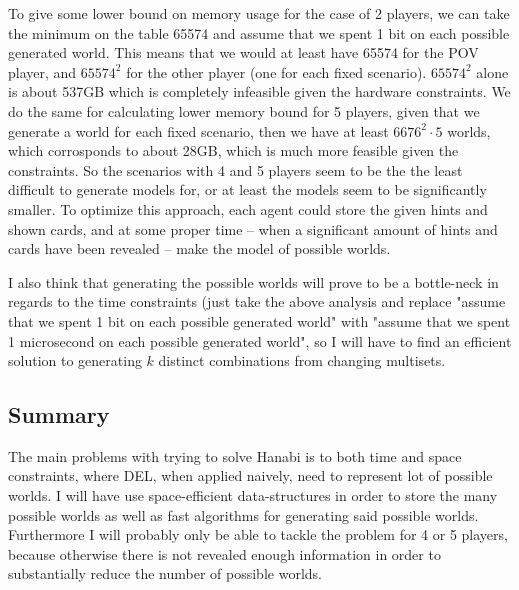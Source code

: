 To give some lower bound on memory usage for the case of 2 players, we can take the minimum on the table 65574 and assume that we spent 1 bit on each possible generated world. This means that we would at least have 65574 for the POV player, and $65574^2$ for the other player (one for each fixed scenario). $65574^2$ alone is about 537GB which is completely infeasible given the hardware constraints. 
We do the same for calculating lower memory bound for 5 players, given that we generate a world for each fixed scenario, then we have at least $6676^2 \cdot 5$ worlds, which corrosponds to about 28GB, which is much more feasible given the constraints.
So the scenarios with 4 and 5 players seem to be the the least difficult to generate models for, or at least the models seem to be significantly smaller.
To optimize this approach, each agent could store the given hints and shown cards, and at some proper time -- when a significant amount of hints and cards have been revealed -- make the model of possible worlds.

I also think that generating the possible worlds will prove to be a bottle-neck in regards to the time constraints (just take the above analysis and replace "assume that we spent 1 bit on each possible generated world" with "assume that we spent 1 microsecond on each possible generated world", so I will have to find an efficient solution to generating $k$ distinct combinations from changing multisets.

\subsection{Summary}
The main problems with trying to solve Hanabi is to both time and space constraints, where DEL, when applied naively, need to represent lot of possible worlds. 
I will have use space-efficient data-structures in order to store the many possible worlds as well as fast algorithms for generating said possible worlds. 
Furthermore I will probably only be able to tackle the problem for 4 or 5 players, because otherwise there is not revealed enough information in order to substantially reduce the number of possible worlds.
